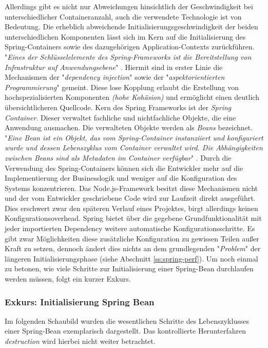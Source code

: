 Allerdings gibt es nicht nur Abweichungen hinsichtlich der Geschwindigkeit bei unterschiedlicher Containeranzahl, auch die verwendete Technologie ist von Bedeutung. Die erheblich abweichende Initialisierungsgeschwindigkeit der beiden unterschiedlichen Komponenten lässt sich im Kern auf die Initialisierung des Spring-Containers sowie des dazugehörigen Application-Contexts zurückführen. "\emph{Eines der Schlüsselelemente des Spring-Frameworks ist die Bereitstellung von Infrastruktur auf Anwendungsebene}" \cite[Seite~53 ff.]{simons-spring}. Hiermit sind in erster Linie die Mechanismen der "\emph{dependency injection}" sowie der "\emph{aspektorientierten Programmierung}" gemeint. Diese lose Kopplung erlaubt die Erstellung von hochspezialisierten Komponenten \emph{(hohe Kohäsion)} und ermöglicht einen deutlich übersichtlicheren Quellcode. Kern des Spring Frameworks ist der \emph{Spring Container}. Dieser verwaltet fachliche und nichtfachliche Objekte, die eine Anwendung ausmachen. Die verwalteten Objekte werden als \emph{Beans} bezeichnet. "\emph{Eine Bean ist ein Objekt, das vom Spring-Container instanziiert und konfiguriert wurde und dessen Lebenszyklus vom Container verwaltet wird. Die Abhängigkeiten zwischen Beans sind als Metadaten im Container verfügbar}" \cite[Kapitel~3.1.1]{simons-spring}. Durch die Verwendung des Spring-Containers können sich die Entwickler mehr auf die Implementierung der Businesslogik und weniger auf die Konfiguration des Systems konzentrieren. Das Node.js-Framework besitzt diese Mechanismen nicht und der vom Entwickler geschriebene Code wird zur Laufzeit direkt ausgeführt. Dies erschwert zwar den späteren Verlauf eines Projektes, birgt allerdings keinen Konfigurationsoverhead. Spring bietet über die gegebene Grundfunktionalität mit jeder importierten Dependency weitere automatische Konfigurationsschritte. Es gibt zwar Möglichkeiten diese zusätzliche Konfiguration zu gewissen Teilen außer Kraft zu setzen, dennoch ändert dies nichts an dem grundlegenden "\emph{Problem}" der längeren Initialisierungsphase (siehe Abschnitt \ref{ss:spring-perf}). Um noch einmal zu betonen, wie viele Schritte zur Initialisierung einer Spring-Bean durchlaufen werden müssen, folgt ein kurzer Exkurs.

\subsubsection{Exkurs: Initialisierung Spring Bean}
Im folgenden Schaubild wurden die wesentlichen Schritte des Lebenszyklusses einer Spring-Bean exemplarisch dargestellt. Das kontrollierte Herunterfahren \emph{destruction} wird hierbei nicht weiter betrachtet. 


